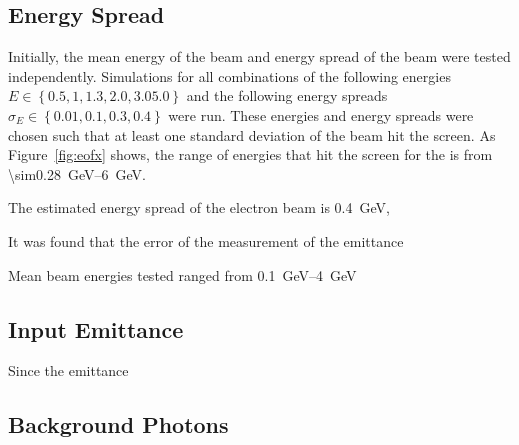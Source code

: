 \subsection{Energy Spread}

Initially, the mean energy of the beam and energy spread of the beam were tested
independently. Simulations for all combinations of the following energies \(E
\in \left\{ 0.5, 1, 1.3, 2.0, 3.0 5.0\right\} \) and the following energy
spreads \(\sigma_E \in \left\{ 0.01, 0.1, 0.3, 0.4 \right\}\) were run.  These
energies and energy spreads were chosen such that at least one standard
deviation of the beam hit the screen. As Figure~\ref{fig:eofx} shows, the range
of energies that hit the screen for the is from
\SIrange{\sim0.28}{6}{\giga\electronvolt}.

The estimated energy spread of the electron beam is
\SI{0.4}{\giga\electronvolt}, 

It was found that the error of the measurement of the emittance 

Mean beam energies tested ranged from \SIrange{0.1}{4}{\giga\electronvolt}

\subsection{Input Emittance}

Since the emittance 

\subsection{Background Photons}
